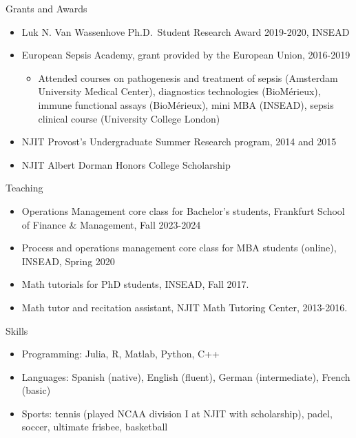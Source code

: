 \documentclass{resume}
\begin{document}
\begin{rSection}{Grants and Awards}

\begin{itemize}
\item Luk N. Van Wassenhove Ph.D.\ Student Research Award 2019-2020, INSEAD
\item European Sepsis Academy, grant provided by the European Union, 2016-2019
\begin{itemize}
  \item Attended courses on pathogenesis and treatment of sepsis (Amsterdam University Medical Center), diagnostics technologies (BioM\'erieux), immune functional assays (BioM\'erieux), mini MBA (INSEAD), sepsis clinical course (University College London)
\end{itemize}
\item NJIT Provost's Undergraduate Summer Research program, 2014 and 2015
\item NJIT Albert Dorman Honors College Scholarship
\end{itemize}

\begin{rSection}{Teaching}
\begin{itemize}
\item Operations Management core class for Bachelor's students, Frankfurt School of Finance \& Management, Fall 2023-2024
\item Process and operations management core class for MBA students (online), INSEAD, Spring 2020
\item Math tutorials for PhD students, INSEAD, Fall 2017.
\item Math tutor and recitation assistant, NJIT Math Tutoring Center, 2013-2016.
\end{itemize}

\end{rSection}


\end{rSection}

\begin{rSection}{Skills}
\begin{itemize}
\item Programming: Julia, R, Matlab, Python, C++
\item Languages: Spanish (native), English (fluent), German (intermediate), French (basic)
\item Sports: tennis (played NCAA division I at NJIT with scholarship), padel, soccer, ultimate frisbee, basketball
\end{itemize}

\end{rSection}
\end{document}
